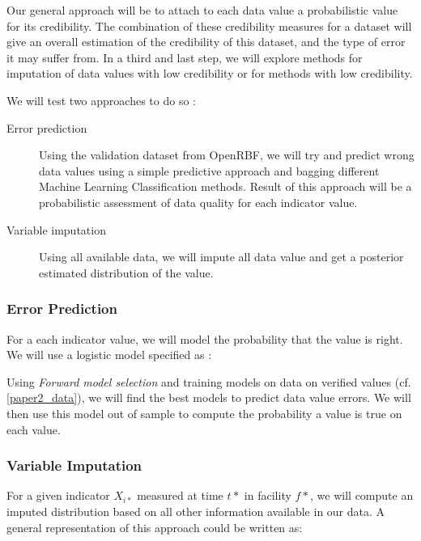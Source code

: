 Our general approach will be to attach to each data value a probabilistic value for its credibility. The combination of these credibility measures for a dataset will give an overall estimation of the credibility of this dataset, and the type of error it may suffer from. In a third and last step, we will explore methods for imputation of data values with low credibility or for methods with low credibility.



We will test two approaches to do so :

\begin{description}
	\item[Error prediction] Using the validation dataset from OpenRBF, we will try and predict wrong data values using a simple predictive approach and bagging different Machine Learning Classification methods. Result of this approach will be a probabilistic assessment of data quality for each indicator value.
	\item[Variable imputation] Using all available data, we will impute all data value and get a posterior estimated distribution of the value.
\end{description}

\subsubsection{Error Prediction}

For a each indicator value, we will model the probability that the value is right. We will use a logistic model specified as :

Using \textit{Forward model selection} and training models on data on verified values (cf. \ref{paper2_data}), we will find the best models to predict data value errors. We will then use this model out of sample to compute the probability a value is true on each value.

\subsubsection{Variable Imputation}

For a given indicator $X_{i*}$ measured at time $t*$ in facility $f*$, we will compute an imputed distribution based on all other information available in our data. A general representation of this approach could be written as:


